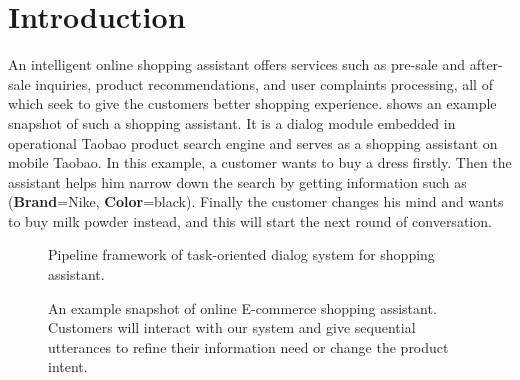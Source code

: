 \section{Introduction}
\label{sec:intro}

An intelligent online shopping assistant
offers services such as pre-sale and after-sale inquiries, 
product recommendations, and user complaints processing,
all of which seek to give the customers better shopping experience.
 shows an example snapshot of 
such a shopping assistant. 
It is a dialog module embedded in operational Taobao product search engine 
and serves as a shopping assistant on mobile Taobao.
In this example, a customer wants to buy a dress firstly. 
Then the assistant helps him
narrow down the search by getting information such as 
(\textbf{Brand}=Nike, \textbf{Color}=black).
Finally the customer changes his mind and wants to buy milk powder instead,
and this will start the next round of conversation.

\begin{figure}[th]
	\centering
	\caption{Pipeline framework of task-oriented dialog system for 
		shopping assistant.}
	\label{fig:dialog-system}
\end{figure}


\begin{figure*}[th]
	\centering
	\caption{An example snapshot of online E-commerce shopping assistant.
	Customers will interact with our system and give sequential utterances to refine their information need or change the product intent.}
	\label{fig:dialog-case}
\end{figure*}

